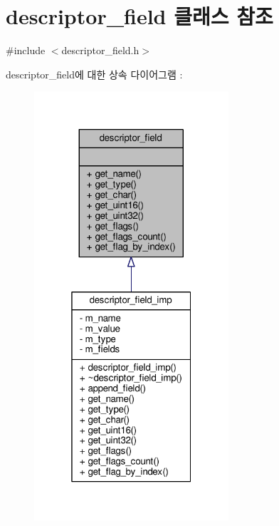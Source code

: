 \hypertarget{classavdecc__lib_1_1descriptor__field}{}\section{descriptor\+\_\+field 클래스 참조}
\label{classavdecc__lib_1_1descriptor__field}


{\ttfamily \#include $<$descriptor\+\_\+field.\+h$>$}



descriptor\+\_\+field에 대한 상속 다이어그램 \+: 
\nopagebreak
\begin{figure}[H]
\begin{center}
\leavevmode
\includegraphics[width=205pt]{classavdecc__lib_1_1descriptor__field__inherit__graph}
\end{center}
\end{figure}



